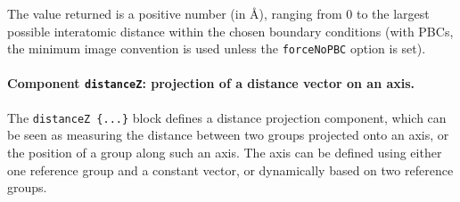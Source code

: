 The value returned is a positive number (in \AA), ranging from $0$
to the largest possible interatomic distance within the chosen
boundary conditions (with PBCs, the minimum image convention is used
unless the \texttt{forceNoPBC} option is set).


\paragraph*{Component \texttt{distanceZ}: projection of a distance vector on an axis.} 
The \texttt{distanceZ~\{...\}} block defines a distance projection
component, which can be seen as measuring the distance between two
groups projected onto an axis, or the position of a group along such
an axis.  The axis can be defined using either one reference group and
a constant vector, or dynamically based on two reference groups.
